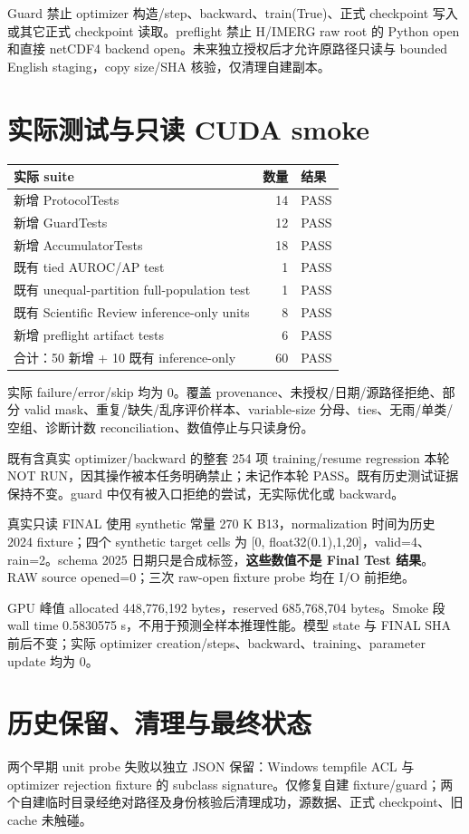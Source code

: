\documentclass[UTF8,11pt,a4paper,fontset=windows]{ctexart}
\begin{document}
Guard 禁止 optimizer 构造/step、backward、train(True)、正式 checkpoint 写入或其它正式 checkpoint 读取。preflight 禁止 H/IMERG raw root 的 Python open 和直接 netCDF4 backend open。未来独立授权后才允许原路径只读与 bounded English staging，copy size/SHA 核验，仅清理自建副本。

\section{实际测试与只读 CUDA smoke}
\begin{longtable}{p{100mm}r l}
\textbf{实际 suite} & \textbf{数量} & \textbf{结果}\\\hline
新增 ProtocolTests &14&PASS\\
新增 GuardTests &12&PASS\\
新增 AccumulatorTests &18&PASS\\
既有 tied AUROC/AP test &1&PASS\\
既有 unequal-partition full-population test &1&PASS\\
既有 Scientific Review inference-only units &8&PASS\\
新增 preflight artifact tests &6&PASS\\\hline
合计：50 新增 + 10 既有 inference-only &60&PASS\\
\end{longtable}
实际 failure/error/skip 均为 0。覆盖 provenance、未授权/日期/源路径拒绝、部分 valid mask、重复/缺失/乱序评价样本、variable-size 分母、ties、无雨/单类/空组、诊断计数 reconciliation、数值停止与只读身份。

既有含真实 optimizer/backward 的整套 254 项 training/resume regression 本轮 NOT RUN，因其操作被本任务明确禁止；未记作本轮 PASS。既有历史测试证据保持不变。guard 中仅有被入口拒绝的尝试，无实际优化或 backward。

真实只读 FINAL 使用 synthetic 常量 270 K B13，normalization 时间为历史 2024 fixture；四个 synthetic target cells 为 [0, float32(0.1),1,20]，valid=4、rain=2。schema 2025 日期只是合成标签，\textbf{这些数值不是 Final Test 结果}。RAW source opened=0；三次 raw-open fixture probe 均在 I/O 前拒绝。

GPU 峰值 allocated 448,776,192 bytes，reserved 685,768,704 bytes。Smoke 段 wall time 0.5830575 s，不用于预测全样本推理性能。模型 state 与 FINAL SHA 前后不变；实际 optimizer creation/steps、backward、training、parameter update 均为 0。

\section{历史保留、清理与最终状态}
两个早期 unit probe 失败以独立 JSON 保留：Windows tempfile ACL 与 optimizer rejection fixture 的 subclass signature。仅修复自建 fixture/guard；两个自建临时目录经绝对路径及身份核验后清理成功，源数据、正式 checkpoint、旧 cache 未触碰。
\end{document}
